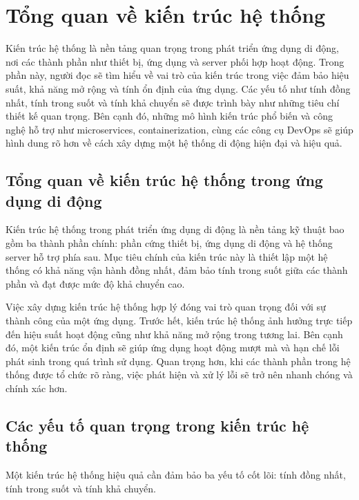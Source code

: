 
\section{Tổng quan về kiến trúc hệ thống}

    Kiến trúc hệ thống là nền tảng quan trọng trong phát triển ứng dụng di động, nơi các thành phần như thiết bị, ứng dụng và server phối hợp hoạt động. Trong phần này, người đọc sẽ tìm hiểu về vai trò của kiến trúc trong việc đảm bảo hiệu suất, khả năng mở rộng và tính ổn định của ứng dụng. Các yếu tố như tính đồng nhất, tính trong suốt và tính khả chuyển sẽ được trình bày như những tiêu chí thiết kế quan trọng. Bên cạnh đó, những mô hình kiến trúc phổ biến và công nghệ hỗ trợ như microservices, containerization, cùng các công cụ DevOps sẽ giúp hình dung rõ hơn về cách xây dựng một hệ thống di động hiện đại và hiệu quả.

    \subsection{Tổng quan về kiến trúc hệ thống trong ứng dụng di động}
    \renewcommand{\labelitemi}{--}    
    
    Kiến trúc hệ thống trong phát triển ứng dụng di động là nền tảng kỹ thuật bao gồm ba thành phần chính: phần cứng thiết bị, ứng dụng di động và hệ thống server hỗ trợ phía sau. Mục tiêu chính của kiến trúc này là thiết lập một hệ thống có khả năng vận hành đồng nhất, đảm bảo tính trong suốt giữa các thành phần và đạt được mức độ khả chuyển cao.
    
    \vspace{0.5em}
  
    Việc xây dựng kiến trúc hệ thống hợp lý đóng vai trò quan trọng đối với sự thành công của một ứng dụng. Trước hết, kiến trúc hệ thống ảnh hưởng trực tiếp đến hiệu suất hoạt động cũng như khả năng mở rộng trong tương lai. Bên cạnh đó, một kiến trúc ổn định sẽ giúp ứng dụng hoạt động mượt mà và hạn chế lỗi phát sinh trong quá trình sử dụng. Quan trọng hơn, khi các thành phần trong hệ thống được tổ chức rõ ràng, việc phát hiện và xử lý lỗi sẽ trở nên nhanh chóng và chính xác hơn.
    

    \subsection{Các yếu tố quan trọng trong kiến trúc hệ thống}
    \renewcommand{\labelitemi}{--}
    
        Một kiến trúc hệ thống hiệu quả cần đảm bảo ba yếu tố cốt lõi: tính đồng nhất, tính trong suốt và tính khả chuyển.
    

